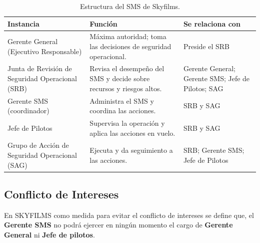 \begin{table}[H]
\centering
\renewcommand{\arraystretch}{1.35}
\begin{tabularx}{\textwidth}{|>{\RaggedRight\arraybackslash}p{4.4cm}|>{\RaggedRight\arraybackslash}X|>{\RaggedRight\arraybackslash}p{4.4cm}|}
\hline
\rowcolor[gray]{0.9}\textbf{Instancia} & \textbf{Función} & \textbf{Se relaciona con} \\ \hline
\rowcolor[HTML]{F4D6D0}Gerente General (Ejecutivo Responsable) & Máxima autoridad; toma las decisiones de seguridad operacional. & Preside el SRB \\ \hline
\rowcolor[HTML]{FFF2A8}Junta de Revisión de Seguridad Operacional (SRB) & Revisa el desempeño del SMS y decide sobre recursos y riesgos altos. & Gerente General; Gerente SMS; Jefe de Pilotos; SAG \\ \hline
\rowcolor[HTML]{FFF2A8}Gerente SMS (coordinador) & Administra el SMS y coordina las acciones. & SRB y SAG \\ \hline
Jefe de Pilotos & Supervisa la operación y aplica las acciones en vuelo. & SRB y SAG \\ \hline
\rowcolor[HTML]{FFF2A8}Grupo de Acción de Seguridad Operacional (SAG) & Ejecuta y da seguimiento a las acciones. & SRB; Gerente SMS; Jefe de Pilotos \\ \hline
\end{tabularx}
\caption{Estructura del SMS de Skyfilms.}
\end{table}


\subsection{Conflicto de Intereses}
En SKYFILMS como medida para evitar el conflicto de intereses se define que, el \textbf{Gerente SMS} no podrá ejercer en ningún momento el cargo de \textbf{Gerente General} ni \textbf{Jefe de pilotos}.


